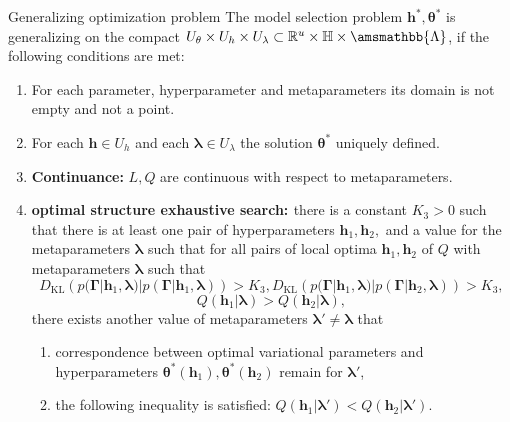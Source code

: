 \documentclass[usenames,dvipsnames,11pt,pdf,utf8,russian,aspectratio=43]{beamer}
\begin{document}
   
\begin{frame}{Generalizing optimization problem}
\footnotesize
The model selection problem  $\mathbf{h}^{*}, \boldsymbol{\theta}^{*}$ is generalizing on the compact $U_{\theta}\times U_{h} \times U_{\lambda} \subset \mathbb{R}^{u} \times \mathbb{H} \times \amsmathbb{\Lambda}$, if the following conditions are met:
\begin{enumerate}
\item For each parameter, hyperparameter and metaparameters its domain is not empty and not a point.
\item For each  $\mathbf{h} \in U_h$ and each  $\boldsymbol{\lambda} \in U_{\lambda}$ the solution  $\boldsymbol{\theta}^{*}$ uniquely defined.


\item \textbf{Continuance:} $L,Q$ are continuous with respect to metaparameters.
\item \textbf{\textcolor{OliveGreen}{optimal structure exhaustive search: }}
there is a constant $K_3>0$ such that there is at least one pair of hyperparameters $\mathbf{h}_1, \mathbf{h}_2,$ and a value for the  metaparameters $\boldsymbol{\lambda}$ such that for all pairs of local optima $\mathbf{h}_1,\mathbf{h}_2$ of $Q$ with metaparameters $\boldsymbol{\lambda}$ such that  $$D_\text{KL}\left(p(\boldsymbol{\Gamma}| \mathbf{h}_1, \boldsymbol{\lambda}) | p(\boldsymbol{\Gamma}| \mathbf{h}_1, \boldsymbol{\lambda})\right) > K_3, D_\text{KL}\left(p(\boldsymbol{\Gamma}| \mathbf{h}_1, \boldsymbol{\lambda}) | p(\boldsymbol{\Gamma}| \mathbf{h}_2, \boldsymbol{\lambda})\right) > K_3,$$ $$Q(\mathbf{h}_1|\boldsymbol{\lambda})>Q(\mathbf{h}_2|\boldsymbol{\lambda}),$$  there exists another value of metaparameters $\boldsymbol{\lambda}' \neq \boldsymbol{\lambda}$ that
\begin{enumerate}
\item correspondence between optimal variational parameters and hyperparameters  $\boldsymbol{\theta}^{*}(\mathbf{h}_1),\boldsymbol{\theta}^{*}(\mathbf{h}_2)$ remain for $\boldsymbol{\lambda}'$,
\item the following inequality is satisfied: $Q(\mathbf{h}_1|\boldsymbol{\lambda}')<Q(\mathbf{h}_2|\boldsymbol{\lambda}')$.
\end{enumerate}



\end{enumerate}
\end{frame}
\end{document}
